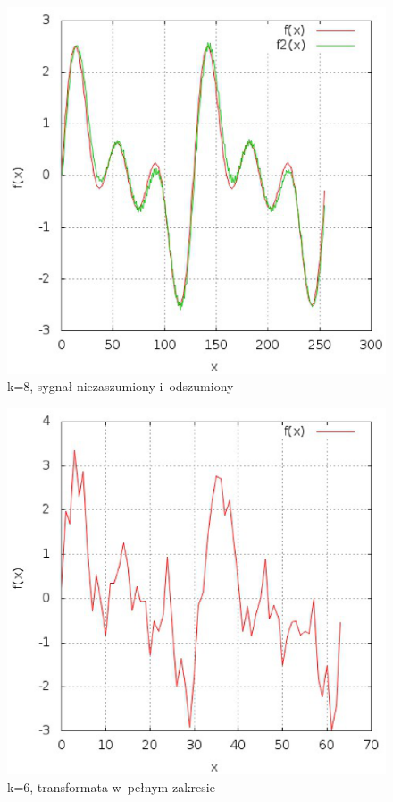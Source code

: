 \documentclass[12pt,a4paper]{article}
\begin{document}
\begin{enumerate}
\begin{figure}
\end{figure}
\begin{figure}
\caption{k=8, sygnał niezaszumiony i~odszumiony}
\includegraphics{k_8_3.eps}
\end{figure}
\begin{figure}
\caption{k=6, transformata w~pełnym zakresie}
\includegraphics{k_6_1.eps}

\end{figure}
\end{enumerate}
\end{document}

